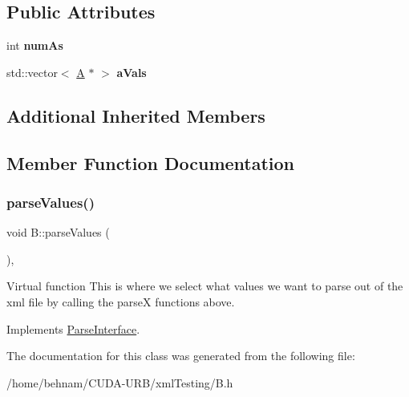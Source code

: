 \subsection*{Public Attributes}
\begin{DoxyCompactItemize}
\item 
\mbox{\label{classB_ad8f0c5df705d57a962e66430411c71cb}} 
int {\bfseries num\+As}
\item 
\mbox{\label{classB_a7e3c14c4eb5bd4cb1543ea4832efc37f}} 
std\+::vector$<$ \hyperlink{classA}{A} $\ast$ $>$ {\bfseries a\+Vals}
\end{DoxyCompactItemize}
\subsection*{Additional Inherited Members}


\subsection{Member Function Documentation}
\mbox{\label{classB_abf3989a414e46fb5dd4bd15a279008ab}} 
\subsubsection{\texorpdfstring{parse\+Values()}{parseValues()}}
{\footnotesize\ttfamily void B\+::parse\+Values (\begin{DoxyParamCaption}{ }\end{DoxyParamCaption})\hspace{0.3cm}{\ttfamily [inline]}, {\ttfamily [virtual]}}

Virtual function This is where we select what values we want to parse out of the xml file by calling the parseX functions above. 

Implements \hyperlink{classParseInterface_afca32108192ba0997c9e5a78189b0cbc}{Parse\+Interface}.



The documentation for this class was generated from the following file\+:\begin{DoxyCompactItemize}
\item 
/home/behnam/\+C\+U\+D\+A-\/\+U\+R\+B/xml\+Testing/B.\+h\end{DoxyCompactItemize}
